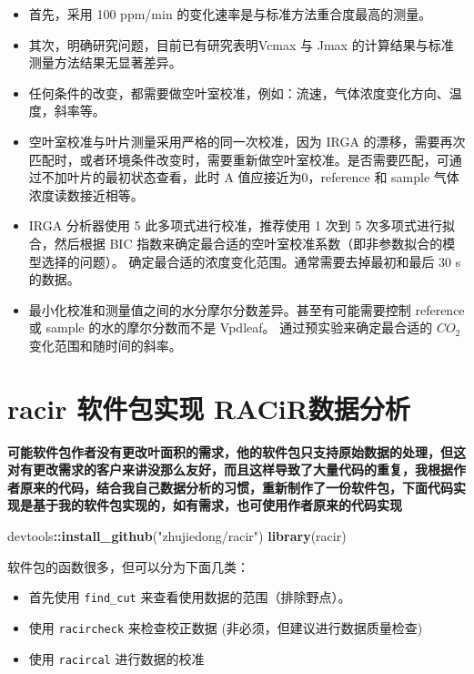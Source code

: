 \documentclass[
]{krantz}
\makeatletter
\newenvironment{Shaded}{\begin{snugshade}}{\end{snugshade}}
\newcommand{\KeywordTok}[1]{\textcolor[rgb]{0.13,0.29,0.53}{\textbf{#1}}}
\newcommand{\NormalTok}[1]{#1}
\newcommand{\OperatorTok}[1]{\textcolor[rgb]{0.81,0.36,0.00}{\textbf{#1}}}
\newcommand{\StringTok}[1]{\textcolor[rgb]{0.31,0.60,0.02}{#1}}
\providecommand{\tightlist}{%
  \setlength{\itemsep}{0pt}\setlength{\parskip}{0pt}}
\newenvironment{kframe}{%
\medskip{}
\setlength{\fboxsep}{.8em}
 \def\at@end@of@kframe{}%
 \ifinner\ifhmode%
  \def\at@end@of@kframe{\end{minipage}}%
  \begin{minipage}{\columnwidth}%
 \fi\fi%
 \def\FrameCommand##1{\hskip\@totalleftmargin \hskip-\fboxsep
 \colorbox{shadecolor}{##1}\hskip-\fboxsep
     \hskip-\linewidth \hskip-\@totalleftmargin \hskip\columnwidth}%
 \MakeFramed {\advance\hsize-\width
   \@totalleftmargin\z@ \linewidth\hsize
   \@setminipage}}%
 {\par\unskip\endMakeFramed%
 \at@end@of@kframe}
\renewenvironment{Shaded}{\begin{kframe}}{\end{kframe}}
\makeatother
\begin{document}
\begin{itemize}
\tightlist
\item
  首先，采用 100 ppm/min 的变化速率是与标准方法重合度最高的测量。
\item
  其次，明确研究问题，目前已有研究表明Vcmax 与 Jmax 的计算结果与标准测量方法结果无显著差异。
\item
  任何条件的改变，都需要做空叶室校准，例如：流速，气体浓度变化方向、温度，斜率等。
\item
  空叶室校准与叶片测量采用严格的同一次校准，因为 IRGA 的漂移，需要再次匹配时，或者环境条件改变时，需要重新做空叶室校准。是否需要匹配，可通过不加叶片的最初状态查看，此时 A 值应接近为0，reference 和 sample 气体浓度读数接近相等。
\item
  IRGA 分析器使用 5 此多项式进行校准，推荐使用 1 次到 5 次多项式进行拟合，然后根据 BIC 指数来确定最合适的空叶室校准系数（即非参数拟合的模型选择的问题）。
  确定最合适的浓度变化范围。通常需要去掉最初和最后 30 s的数据。
\item
  最小化校准和测量值之间的水分摩尔分数差异。甚至有可能需要控制 reference 或 sample 的水的摩尔分数而不是 Vpdleaf。
  通过预实验来确定最合适的 \(CO_2\) 变化范围和随时间的斜率。
\end{itemize}

\hypertarget{racir_pkg}{%
\section{\texorpdfstring{racir 软件包实现 RACiR\texttrademark 数据分析}{racir 软件包实现 RACiR数据分析}}\label{racir_pkg}}

\textbf{可能软件包作者没有更改叶面积的需求，他的软件包只支持原始数据的处理，但这对有更改需求的客户来讲没那么友好，而且这样导致了大量代码的重复，我根据作者原来的代码，结合我自己数据分析的习惯，重新制作了一份软件包，下面代码实现是基于我的软件包实现的，如有需求，也可使用作者原来的代码实现}

\begin{Shaded}
\begin{Highlighting}[]
\NormalTok{devtools}\OperatorTok{::}\KeywordTok{install_github}\NormalTok{(}\StringTok{"zhujiedong/racir"}\NormalTok{)}
\KeywordTok{library}\NormalTok{(racir)}
\end{Highlighting}
\end{Shaded}

软件包的函数很多，但可以分为下面几类：

\begin{itemize}
\item
  首先使用 \texttt{find\_cut} 来查看使用数据的范围（排除野点）。
\item
  使用 \texttt{racircheck} 来检查校正数据 (非必须，但建议进行数据质量检查)
\item
  使用 \texttt{racircal} 进行数据的校准
\end{itemize}
\end{document}
